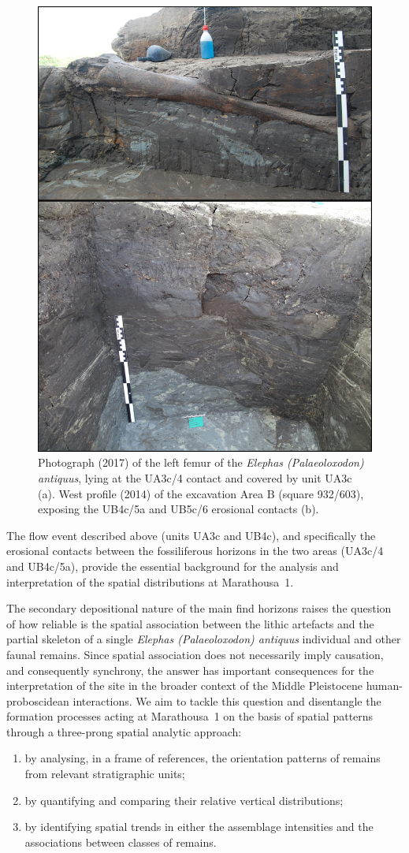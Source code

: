 \documentclass[preprint,authoryear,times]{elsarticle} %
\begin{document}
\begin{figure}[]
  \centering
  \includegraphics[width=.5\textwidth]{../artwork/Fig4.png}
  \caption{Photograph (2017) of the left femur of the \emph{Elephas (Palaeoloxodon) antiquus}, lying at the UA3c/4 contact and covered by unit UA3c (a). West profile (2014) of the excavation Area B (square 932/603), exposing the UB4c/5a and UB5c/6 erosional contacts (b).}
  \label{fig:4}
\end{figure}

The flow event described above (units UA3c and UB4c), and specifically the erosional contacts between the fossiliferous horizons in the two areas (UA3c/4 and UB4c/5a), provide the essential background for the analysis and interpretation of the spatial distributions at Marathousa~1.

The secondary depositional nature of the main find horizons raises the question of how reliable is the spatial association between the lithic artefacts and the partial skeleton of a single \emph{Elephas (Palaeoloxodon) antiquus} individual and other faunal remains. Since spatial association does not necessarily imply causation, and consequently synchrony, the answer has important consequences for the interpretation of the site in the broader context of the Middle Pleistocene human-proboscidean interactions. We aim to tackle this question and disentangle the formation processes acting at Marathousa~1 on the basis of spatial patterns through a three-prong spatial analytic approach:
\begin{enumerate}
\item by analysing, in a frame of references, the orientation patterns of remains from relevant stratigraphic units;
\item by quantifying and comparing their relative vertical distributions;
\item by identifying spatial trends in either the assemblage intensities and the associations between classes of remains.
\end{enumerate}
\end{document}
